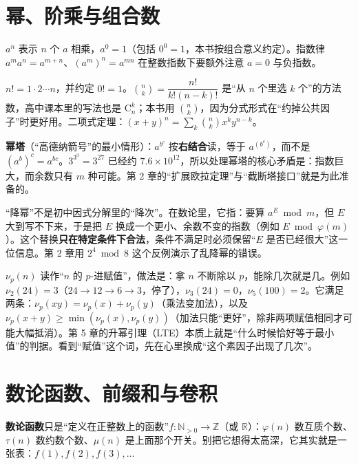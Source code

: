 \documentclass[UTF8,a4paper,11pt,oneside,openany,fontset=fandol]{ctexbook}
\theoremstyle{definition}
\newcommand{\Z}{\mathbb Z}
\newcommand{\N}{\mathbb N}
\begin{document}
\section{幂、阶乘与组合数}
$a^n$ 表示 $n$ 个 $a$ 相乘，$a^0=1$（包括 $0^0=1$，本书按组合意义约定）。指数律 $a^{m}a^{n}=a^{m+n}$、$(a^m)^n=a^{mn}$ 在整数指数下要额外注意 $a=0$ 与负指数。

$n!=1\cdot2\cdots n$，并约定 $0!=1$。$\binom{n}{k}=\dfrac{n!}{k!(n-k)!}$ 是“从 $n$ 个里选 $k$ 个”的方法数，高中课本里的写法也是 $\mathrm{C}_n^k$；本书用 $\binom{n}{k}$，因为分式形式在“约掉公共因子”时更好用。二项式定理：$(x+y)^n=\sum_{k}\binom{n}{k}x^{k}y^{n-k}$。

\textbf{幂塔}（“高德纳箭号”的最小情形）：$a^{b^{c}}$ 按\textbf{右结合}读，等于 $a^{(b^c)}$，而不是 $(a^b)^c=a^{bc}$。$3^{3^{3}}=3^{27}$ 已经约 $7.6\times10^{12}$，所以处理幂塔的核心矛盾是：指数巨大，而余数只有 $m$ 种可能。第 2 章的“扩展欧拉定理”与“截断塔接口”就是为此准备的。

\begin{tip}[“降幂”是什么意思]
“降幂”不是初中因式分解里的“降次”。在数论里，它指：要算 $a^E\bmod m$，但 $E$ 大到写不下来，于是把 $E$ 换成一个更小、余数不变的指数（例如 $E\bmod\varphi(m)$）。这个替换\textbf{只在特定条件下合法}，条件不满足时必须保留“$E$ 是否已经很大”这一位信息。第 2 章用 $2^4\bmod 8$ 这个反例演示了乱降幂的错误。
\end{tip}

\begin{tip}
$\nu_p(n)$ 读作“$n$ 的 $p$-进赋值”，做法是：拿 $n$ 不断除以 $p$，能除几次就是几。例如 $\nu_2(24)=3$（$24\to12\to6\to3$，停了），$\nu_3(24)=0$，$\nu_5(100)=2$。它满足两条：$\nu_p(xy)=\nu_p(x)+\nu_p(y)$（乘法变加法），以及 $\nu_p(x+y)\ge\min(\nu_p(x),\nu_p(y))$（加法只能“更好”，除非两项赋值相同才可能大幅抵消）。第 5 章的升幂引理（LTE）本质上就是“什么时候恰好等于最小值”的判据。看到“赋值”这个词，先在心里换成“这个素因子出现了几次”。
\end{tip}

\section{数论函数、前缀和与卷积}
\textbf{数论函数}只是“定义在正整数上的函数”$f:\N_{>0}\to\Z$（或 $\mathbb R$）：$\varphi(n)$ 数互质个数、$\tau(n)$ 数约数个数、$\mu(n)$ 是上面那个开关。别把它想得太高深，它其实就是一张表：$f(1),f(2),f(3),\ldots$
\end{document}
